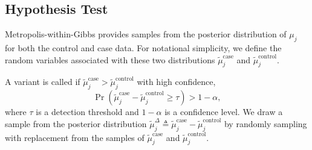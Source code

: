 \documentclass[11pt,reqno]{amsart}
\begin{document}
\subsection{Hypothesis Test}
Metropolis-within-Gibbs provides samples from the posterior distribution of $\mu_j$ for both the control and case data. For notational simplicity, we define the random variables associated with these two distributions $\tilde{\mu}_j^{\text{case}}$ and $\tilde{\mu}_j^{\text{control}}$.

A variant is called if $\tilde{\mu}_j^{\text{case}} > \tilde{\mu}_j^{\text{control}}$ with high confidence,
\begin{equation}
	\Pr( \tilde{\mu}_j^{\text{case}} - \tilde{\mu}_j^{\text{control}} \geq \tau ) > 1-\alpha,
\end{equation}
where $\tau$ is a detection threshold and $1-\alpha$ is a confidence level. We draw a sample from the posterior distribution $\tilde{\mu}_j^{\Delta} \triangleq \tilde{\mu}_j^{\text{case}} - \tilde{\mu}_j^{\text{control}}$ by randomly sampling with replacement from the samples of $\tilde{\mu}_j^{\text{case}}$ and $\tilde{\mu}_j^{\text{control}}$.



\end{document}
